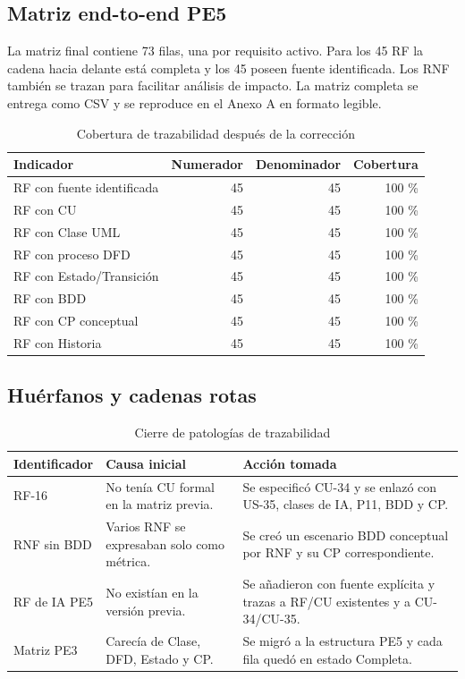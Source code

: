 \documentclass[11pt,a4paper]{article}
\begin{document}
\subsection{Matriz end-to-end PE5}
La matriz final contiene 73 filas, una por requisito activo. Para los 45 RF la cadena hacia delante está completa y los 45 poseen fuente identificada. Los RNF también se trazan para facilitar análisis de impacto. La matriz completa se entrega como CSV y se reproduce en el Anexo A en formato legible.

\begin{table}[H]\centering\caption{Cobertura de trazabilidad después de la corrección}\label{tab:trazares}
	\begin{tabular}{lrrr}\toprule\textbf{Indicador}&\textbf{Numerador}&\textbf{Denominador}&\textbf{Cobertura}\\\midrule
		RF con fuente identificada&45&45&100 \%\\
		RF con CU&45&45&100 \%\\
		RF con Clase UML&45&45&100 \%\\
		RF con proceso DFD&45&45&100 \%\\
		RF con Estado/Transición&45&45&100 \%\\
		RF con BDD&45&45&100 \%\\
		RF con CP conceptual&45&45&100 \%\\
		RF con Historia&45&45&100 \%\\\bottomrule\end{tabular}\end{table}

\subsection{Huérfanos y cadenas rotas}
\begin{table}[H]\centering\caption{Cierre de patologías de trazabilidad}\label{tab:huerfanos}
	\begin{tabularx}{\textwidth}{p{3cm}Y Y}\toprule\textbf{Identificador}&\textbf{Causa inicial}&\textbf{Acción tomada}\\\midrule
		RF-16&No tenía CU formal en la matriz previa.&Se especificó CU-34 y se enlazó con US-35, clases de IA, P11, BDD y CP.\\
		RNF sin BDD&Varios RNF se expresaban solo como métrica.&Se creó un escenario BDD conceptual por RNF y su CP correspondiente.\\
		RF de IA PE5&No existían en la versión previa.&Se añadieron con fuente explícita y trazas a RF/CU existentes y a CU-34/CU-35.\\
		Matriz PE3&Carecía de Clase, DFD, Estado y CP.&Se migró a la estructura PE5 y cada fila quedó en estado Completa.\\\bottomrule\end{tabularx}\end{table}
\end{document}
